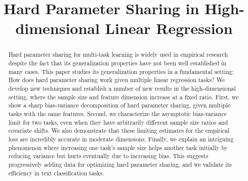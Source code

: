 \documentclass[aos,preprint]{imsart}
\newcommand*\samethanks[1][\value{footnote}]{\footnotemark[#1]}
\begin{document}
\begin{frontmatter}
\title{Hard Parameter Sharing in High-dimensional Linear Regression}


\begin{abstract}
	Hard parameter sharing for multi-task learning is widely used in empirical research despite the fact that its generalization properties have not been well established in many cases. This paper studies its generalization properties in a fundamental setting: How does hard parameter sharing work given multiple linear regression tasks? We develop new techniques and establish a number of new results in the high-dimensional setting, where the sample size and feature dimension increase at a fixed ratio. First, we show a sharp bias-variance decomposition of hard parameter sharing, given multiple tasks with the same features. Second, we characterize the asymptotic bias-variance limit for two tasks, even when they have arbitrarily different sample size ratios and covariate shifts. We also demonstrate that these limiting estimates for the empirical loss are incredibly accurate in moderate dimensions. Finally, we explain an intriguing phenomenon where increasing one task's sample size helps another task initially by reducing variance but hurts eventually due to increasing bias. This suggests progressively adding data for optimizing hard parameter sharing, and we validate its efficiency in text classification tasks.
\end{abstract}


\end{frontmatter}
\end{document}
